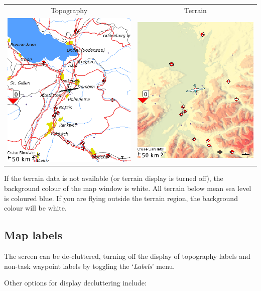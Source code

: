 \begin{tabular}{c c}
Topography & Terrain \\
\includegraphics[angle=0,width=0.4\linewidth,keepaspectratio='true']{figures/cut-topo.png} &
\includegraphics[angle=0,width=0.4\linewidth,keepaspectratio='true']{figures/cut-terrain.png} \\
\end{tabular}

If the terrain data is not available (or terrain display is turned
off), the background colour of the map window is white.  All terrain
below mean sea level is coloured blue.  If you are flying outside the
terrain region, the background colour will be white.

\subsection*{Map labels}\label{sec:maplabels}

The screen can be de-cluttered, turning off the display of topography
labels and non-task waypoint labels by toggling the `{\it Labels}' menu.

Other options for display decluttering include:



